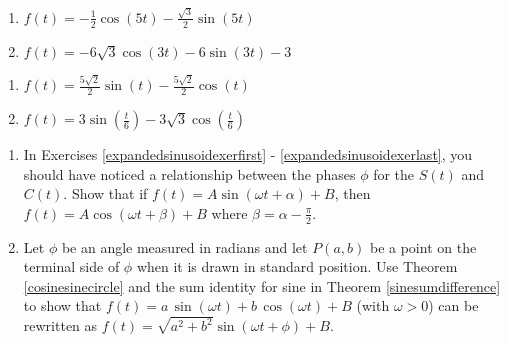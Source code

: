 \begin{multicols}{2}

\begin{enumerate}

\setcounter{enumi}{\value{HW}}

\item  $f(t) = -\frac{1}{2} \cos(5t) -\frac{\sqrt{3}}{2} \sin(5t)$
\item  $f(t) = -6\sqrt{3} \cos(3t) - 6\sin(3t) - 3$  

\setcounter{HW}{\value{enumi}}

\end{enumerate}

\end{multicols}

\begin{multicols}{2}

\begin{enumerate}

\setcounter{enumi}{\value{HW}}

\item  $f(t) =  \frac{5\sqrt{2}}{2} \sin(t)  -\frac{5\sqrt{2}}{2} \cos(t)$
\item  $f(t) =3 \sin \left(\frac{t}{6}\right) -3\sqrt{3} \cos \left(\frac{t}{6}\right)$   \label{expandedsinusoidexerlast}

\setcounter{HW}{\value{enumi}}

\end{enumerate}

\end{multicols}


\begin{enumerate}

\setcounter{enumi}{\value{HW}}

\item In Exercises \ref{expandedsinusoidexerfirst} - \ref{expandedsinusoidexerlast}, you should have noticed a relationship between the phases $\phi$ for the $S(t)$ and $C(t)$.  Show that if $f(t) = A \sin(\omega t + \alpha) + B$, then $f(t) = A \cos(\omega t + \beta) + B$ where $\beta = \alpha - \frac{\pi}{2}$. 
\label{sinusoidexercise1}

\item Let $\phi$ be an angle measured in radians and let $P(a,b)$ be a point on the terminal side of $\phi$ when it is drawn in standard position.  Use Theorem \ref{cosinesinecircle} and the sum identity for sine in Theorem \ref{sinesumdifference} to show that  $f(t) = a \, \sin(\omega t) + b\, \cos(\omega t) + B$ (with  $\omega > 0$) can be rewritten as $f(t) = \sqrt{a^{2} + b^{2}}\sin(\omega t + \phi) + B$.
\label{sinusoidexercise2}

\setcounter{HW}{\value{enumi}}

\end{enumerate}

